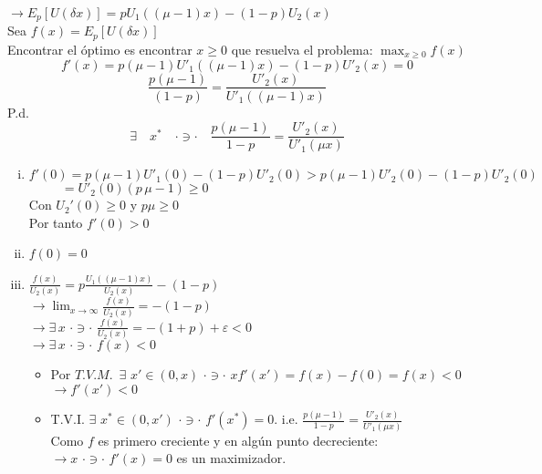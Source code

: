 $\rightarrow E_p[U(\delta x)]=pU_1((\mu-1)x)-(1-p)U_2(x)$\\

Sea $f(x)=E_p[U(\delta x)]$\\

Encontrar el óptimo es encontrar $x \ge 0$ que resuelva el problema: $\displaystyle \max_{x\ge0}f(x)$\\

\[f'(x)=p(\mu-1)U'_1((\mu-1)x)-(1-p)U'_2(x)=0\]
\[\frac{p(\mu-1)}{(1-p)}=\frac{U'_2(x)}{U'_1((\mu-1)x)}\]
P.d.$$\exists \quad x^* \quad \cdot \ni \cdot \quad \frac{p(\mu-1)}{1-p}=\frac{U'_2(x)}{U'_1(\mu x)}$$

\begin{enumerate}[(i)]

 \item $f'(0)=p(\mu-1)U'_1(0)-(1-p)U'_2(0)>p(\mu-1)U'_2(0)-(1-p)U'_2(0)$\\
 
 $\,\,\,\quad\quad=U'_2(0)(p\,\mu-1)\ge 0$\\
 
 Con $U_2'(0)\ge 0$ y $p\mu\ge0$\\
 Por tanto $f'(0)>0$
 
 \item $f(0)=0$
 \item $\displaystyle\frac{f(x)}{U_2(x)}=p\displaystyle\frac{U_1((\mu-1)x)}{U_2(x)}-(1-p)$\\
 $\rightarrow \displaystyle \lim_{x\rightarrow\infty}\frac{f(x)}{U_2(x)}=-(1-p)$\\
 
 $\rightarrow \exists \, x\,\,\cdot \ni \cdot \,\, \displaystyle\frac{f(x)}{U_2(x)}=-(1+p)+\varepsilon<0$\\
 
 $\rightarrow \exists\,x\,\,\cdot \ni \cdot \,\,f(x)<0$
 \begin{itemize}
  \item Por $T.V.M.\,\,\,\exists\,\, x'\in(0,x)\,\,\cdot \ni \cdot \,\,xf'(x')=f(x)-f(0)=f(x)<0$\\
  $\rightarrow f'(x')<0$
  \item T.V.I. $\exists\,\, x^*\in(0,x')\,\,\cdot \ni \cdot \,\,f'(x^*)=0$. i.e. $\displaystyle\frac{p(\mu-1)}{1-p}=\displaystyle\frac{U'_2(x)}{U'_1(\mu x)}$\\
  
  Como $f$ es primero creciente y en algún punto decreciente:\\
  $\rightarrow x\,\,\cdot \ni\cdot\,\,f'(x)=0$ es un maximizador.
 \end{itemize}
\end{enumerate}

